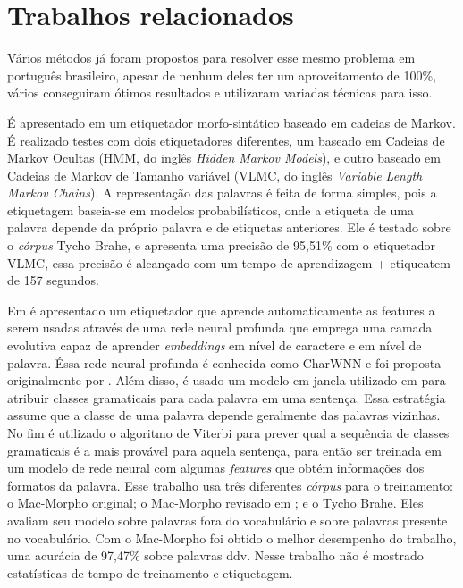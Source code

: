 \chapter{Trabalhos relacionados}\label{trabalhosrelacionados}

Vários métodos já foram propostos para resolver esse mesmo problema em português brasileiro, apesar de nenhum deles ter um aproveitamento de 100\%, vários conseguiram ótimos resultados e utilizaram variadas técnicas para isso.

É apresentado em \cite{kepler2005etiquetador} um etiquetador morfo-sintático baseado em cadeias de Markov. É realizado testes com dois etiquetadores diferentes, um baseado em Cadeias de Markov Ocultas (HMM, do inglês \textit{Hidden Markov Models}), e outro baseado em Cadeias de Markov de Tamanho variável (VLMC, do inglês \textit{Variable Length Markov Chains}). A representação das palavras é feita de forma simples, pois a etiquetagem baseia-se em modelos probabilísticos, onde a etiqueta de uma palavra depende da próprio palavra e de etiquetas anteriores. Ele é testado sobre o \textit{córpus} Tycho Brahe, e apresenta uma precisão de 95,51\% com o etiquetador VLMC, essa precisão é alcançado com um tempo de aprendizagem + etiqueatem de 157 segundos. 

Em \cite{dos2014training} é apresentado um etiquetador que aprende automaticamente as features a serem usadas através de uma rede neural profunda que emprega uma camada evolutiva capaz de aprender \textit{embeddings} em nível de caractere e em nível de palavra. Éssa rede neural profunda é conhecida como CharWNN e foi proposta originalmente por . Além disso, é usado um modelo em janela utilizado em \cite{collobert2011natural} para atribuir classes gramaticais para cada palavra em uma sentença. Essa estratégia assume que a classe de uma palavra depende geralmente das palavras vizinhas. No fim é utilizado o algoritmo de Viterbi \cite{viterbi1967error} para prever qual a sequência de classes gramaticais é a mais provável para aquela sentença, para então ser treinada em um modelo de rede neural com algumas \textit{features} que obtém informações dos formatos da palavra. Esse trabalho usa três diferentes \textit{córpus} para o treinamento: o Mac-Morpho original; o Mac-Morpho revisado em \cite{fonseca2013mac}; e o Tycho Brahe. Eles avaliam seu modelo sobre palavras fora do vocabulário e sobre palavras presente no vocabulário. Com o Mac-Morpho foi obtido o melhor desempenho do trabalho, uma acurácia de 97,47\% sobre palavras \ac{ddv}. Nesse trabalho não é mostrado estatísticas de tempo de treinamento e etiquetagem.

